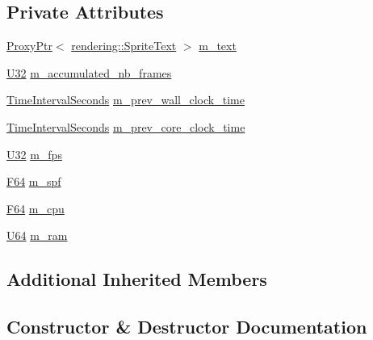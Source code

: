 \subsection*{Private Attributes}
\begin{DoxyCompactItemize}
\item 
\mbox{\hyperlink{classmage_1_1_proxy_ptr}{Proxy\+Ptr}}$<$ \mbox{\hyperlink{classmage_1_1rendering_1_1_sprite_text}{rendering\+::\+Sprite\+Text}} $>$ \mbox{\hyperlink{classmage_1_1script_1_1_stats_script_a1fe11e7a3622fa5e3585fb6786e2d2e7}{m\+\_\+text}}
\item 
\mbox{\hyperlink{namespacemage_aa5d6eaabaac3cdd01873d6a3d27e90f3}{U32}} \mbox{\hyperlink{classmage_1_1script_1_1_stats_script_a7ef910aceb585af53110697ea5b3f810}{m\+\_\+accumulated\+\_\+nb\+\_\+frames}}
\item 
\mbox{\hyperlink{namespacemage_a21c3d1575018d1e0720948713c76be1f}{Time\+Interval\+Seconds}} \mbox{\hyperlink{classmage_1_1script_1_1_stats_script_acb97500f32da69e9069482df1ebdb7b8}{m\+\_\+prev\+\_\+wall\+\_\+clock\+\_\+time}}
\item 
\mbox{\hyperlink{namespacemage_a21c3d1575018d1e0720948713c76be1f}{Time\+Interval\+Seconds}} \mbox{\hyperlink{classmage_1_1script_1_1_stats_script_a8bf822cd1950abc621f8bd751c00ef78}{m\+\_\+prev\+\_\+core\+\_\+clock\+\_\+time}}
\item 
\mbox{\hyperlink{namespacemage_aa5d6eaabaac3cdd01873d6a3d27e90f3}{U32}} \mbox{\hyperlink{classmage_1_1script_1_1_stats_script_adc14b9c342874824422d229c1f8573cc}{m\+\_\+fps}}
\item 
\mbox{\hyperlink{namespacemage_ad26233bbec640deda836e572c1a23708}{F64}} \mbox{\hyperlink{classmage_1_1script_1_1_stats_script_ae32bfd55bb3b29193e027c5fcb62eb94}{m\+\_\+spf}}
\item 
\mbox{\hyperlink{namespacemage_ad26233bbec640deda836e572c1a23708}{F64}} \mbox{\hyperlink{classmage_1_1script_1_1_stats_script_a887ffefd429c5574cc425c723113f0e6}{m\+\_\+cpu}}
\item 
\mbox{\hyperlink{namespacemage_ae0ad2dd0035dba92ed0f2e84c182b03b}{U64}} \mbox{\hyperlink{classmage_1_1script_1_1_stats_script_ab00289b3aa45f91fd53bda500a45a653}{m\+\_\+ram}}
\end{DoxyCompactItemize}
\subsection*{Additional Inherited Members}


\subsection{Constructor \& Destructor Documentation}
\mbox{\label{classmage_1_1script_1_1_stats_script_a6863940cb48633fbd5fc56547dc72a76}} 

